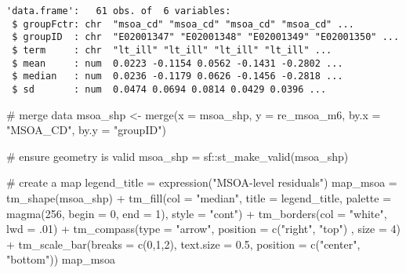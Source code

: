 \documentclass[
  letterpaper,
  krantz2]{style/krantz}
\newenvironment{Shaded}{\begin{snugshade}}{\end{snugshade}}
\newcommand{\AttributeTok}[1]{\textcolor[rgb]{0.40,0.45,0.13}{#1}}
\newcommand{\CommentTok}[1]{\textcolor[rgb]{0.37,0.37,0.37}{#1}}
\newcommand{\DecValTok}[1]{\textcolor[rgb]{0.68,0.00,0.00}{#1}}
\newcommand{\FloatTok}[1]{\textcolor[rgb]{0.68,0.00,0.00}{#1}}
\newcommand{\FunctionTok}[1]{\textcolor[rgb]{0.28,0.35,0.67}{#1}}
\newcommand{\NormalTok}[1]{\textcolor[rgb]{0.00,0.23,0.31}{#1}}
\newcommand{\OtherTok}[1]{\textcolor[rgb]{0.00,0.23,0.31}{#1}}
\newcommand{\SpecialCharTok}[1]{\textcolor[rgb]{0.37,0.37,0.37}{#1}}
\newcommand{\StringTok}[1]{\textcolor[rgb]{0.13,0.47,0.30}{#1}}
\begin{document}
\begin{verbatim}
'data.frame':   61 obs. of  6 variables:
 $ groupFctr: chr  "msoa_cd" "msoa_cd" "msoa_cd" "msoa_cd" ...
 $ groupID  : chr  "E02001347" "E02001348" "E02001349" "E02001350" ...
 $ term     : chr  "lt_ill" "lt_ill" "lt_ill" "lt_ill" ...
 $ mean     : num  0.0223 -0.1154 0.0562 -0.1431 -0.2802 ...
 $ median   : num  0.0236 -0.1179 0.0626 -0.1456 -0.2818 ...
 $ sd       : num  0.0474 0.0694 0.0814 0.0429 0.0396 ...
\end{verbatim}

\begin{Shaded}
\begin{Highlighting}[]
\CommentTok{\# merge data}
\NormalTok{msoa\_shp }\OtherTok{\textless{}{-}} \FunctionTok{merge}\NormalTok{(}\AttributeTok{x =}\NormalTok{ msoa\_shp, }\AttributeTok{y =}\NormalTok{ re\_msoa\_m6, }\AttributeTok{by.x =} \StringTok{"MSOA\_CD"}\NormalTok{, }\AttributeTok{by.y =} \StringTok{"groupID"}\NormalTok{)}
\end{Highlighting}
\end{Shaded}

\begin{Shaded}
\begin{Highlighting}[]
\CommentTok{\# ensure geometry is valid}
\NormalTok{msoa\_shp }\OtherTok{=}\NormalTok{ sf}\SpecialCharTok{::}\FunctionTok{st\_make\_valid}\NormalTok{(msoa\_shp)}

\CommentTok{\# create a map}
\NormalTok{legend\_title }\OtherTok{=} \FunctionTok{expression}\NormalTok{(}\StringTok{"MSOA{-}level residuals"}\NormalTok{)}
\NormalTok{map\_msoa }\OtherTok{=} \FunctionTok{tm\_shape}\NormalTok{(msoa\_shp) }\SpecialCharTok{+}
  \FunctionTok{tm\_fill}\NormalTok{(}\AttributeTok{col =} \StringTok{"median"}\NormalTok{, }\AttributeTok{title =}\NormalTok{ legend\_title, }\AttributeTok{palette =} \FunctionTok{magma}\NormalTok{(}\DecValTok{256}\NormalTok{, }\AttributeTok{begin =} \DecValTok{0}\NormalTok{, }\AttributeTok{end =} \DecValTok{1}\NormalTok{), }\AttributeTok{style =} \StringTok{"cont"}\NormalTok{) }\SpecialCharTok{+} 
  \FunctionTok{tm\_borders}\NormalTok{(}\AttributeTok{col =} \StringTok{"white"}\NormalTok{, }\AttributeTok{lwd =}\NormalTok{ .}\DecValTok{01}\NormalTok{)  }\SpecialCharTok{+} 
  \FunctionTok{tm\_compass}\NormalTok{(}\AttributeTok{type =} \StringTok{"arrow"}\NormalTok{, }\AttributeTok{position =} \FunctionTok{c}\NormalTok{(}\StringTok{"right"}\NormalTok{, }\StringTok{"top"}\NormalTok{) , }\AttributeTok{size =} \DecValTok{4}\NormalTok{) }\SpecialCharTok{+} 
  \FunctionTok{tm\_scale\_bar}\NormalTok{(}\AttributeTok{breaks =} \FunctionTok{c}\NormalTok{(}\DecValTok{0}\NormalTok{,}\DecValTok{1}\NormalTok{,}\DecValTok{2}\NormalTok{), }\AttributeTok{text.size =} \FloatTok{0.5}\NormalTok{, }\AttributeTok{position =}  \FunctionTok{c}\NormalTok{(}\StringTok{"center"}\NormalTok{, }\StringTok{"bottom"}\NormalTok{)) }
\NormalTok{map\_msoa}
\end{Highlighting}
\end{Shaded}
\end{document}
